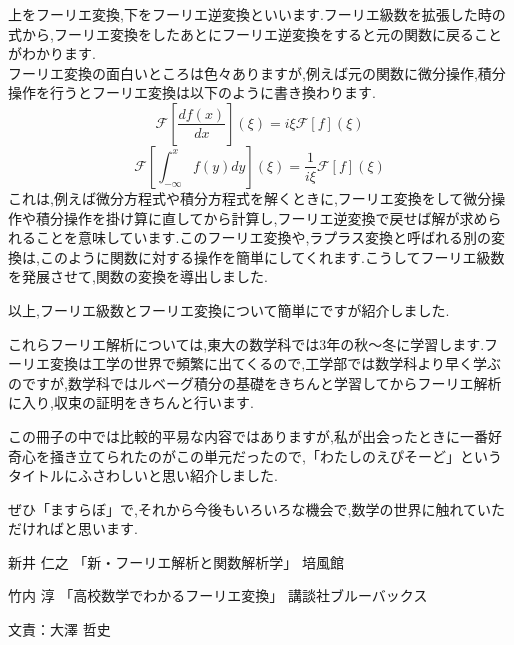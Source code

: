 上をフーリエ変換,下をフーリエ逆変換といいます.フーリエ級数を拡張した時の式から,フーリエ変換をしたあとにフーリエ逆変換をすると元の関数に戻ることがわかります.\\
フーリエ変換の面白いところは色々ありますが,例えば元の関数に微分操作,積分操作を行うとフーリエ変換は以下のように書き換わります.\\
\[
  \mathcal{F}[\frac{df(x)}{dx}](\xi) = i\xi \mathcal{F}[f](\xi)
\]
\[
  \mathcal{F}[\int_{-\infty}^x f(y) dy](\xi) =\frac{1}{i\xi} \mathcal{F}[f](\xi)
\]
これは,例えば微分方程式や積分方程式を解くときに,フーリエ変換をして微分操作や積分操作を掛け算に直してから計算し,フーリエ逆変換で戻せば解が求められることを意味しています.このフーリエ変換や,ラプラス変換と呼ばれる別の変換は,このように関数に対する操作を簡単にしてくれます.こうしてフーリエ級数を発展させて,関数の変換を導出しました.

以上,フーリエ級数とフーリエ変換について簡単にですが紹介しました.

これらフーリエ解析については,東大の数学科では3年の秋〜冬に学習します.フーリエ変換は工学の世界で頻繁に出てくるので,工学部では数学科より早く学ぶのですが,数学科ではルベーグ積分の基礎をきちんと学習してからフーリエ解析に入り,収束の証明をきちんと行います.

この冊子の中では比較的平易な内容ではありますが,私が出会ったときに一番好奇心を掻き立てられたのがこの単元だったので,「わたしのえぴそーど」というタイトルにふさわしいと思い紹介しました.

ぜひ「ますらぼ」で,それから今後もいろいろな機会で,数学の世界に触れていただければと思います.
\begin{thebibliography}{9}
\item 新井 仁之 「新・フーリエ解析と関数解析学」 培風館
\item 竹内 淳 「高校数学でわかるフーリエ変換」 講談社ブルーバックス
\end{thebibliography}

文責：大澤 哲史
